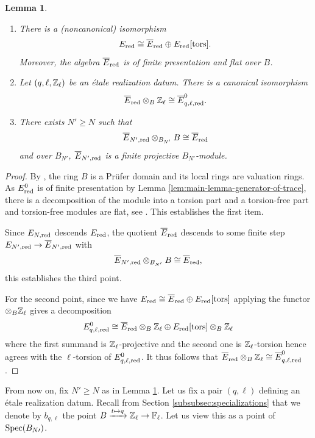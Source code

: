 \documentclass[a4paper, 10pt, oneside, reqno]{amsart}
\theoremstyle{plain}
\newtheorem{lem}[thm]{Lemma}
\theoremstyle{definition}
\theoremstyle{remark}
\begin{document}
\begin{lem}\label{lem:structural-properties-reduced-ring}
\begin{enumerate}
\item There is a (noncanonical) isomorphism 
$$E_{\mathrm{red}} \cong \overline{E}_{\mathrm{red}} \oplus E_{\mathrm{red}}[\mathrm{tors}].$$
Moreover, the algebra $\overline{E}_{\mathrm{red}}$ is of finite presentation and flat over $B$.
\item Let $(q,\ell, \mathbb{Z}_{\ell})$ be an étale realization datum. There is a canonical isomorphism 
$$\overline{E}_{\mathrm{red}} \otimes_B \mathbb{Z}_{\ell} \cong \overline{E}^{0}_{q,\ell,\mathrm{red}}.$$
\item There exists $N' \geq N$ such that 
$$\overline{E}_{N', \mathrm{red}} \otimes_{B_{N'}} B \cong \overline{E}_{\mathrm{red}}$$
and over $B_{N'}$, $\overline{E}_{N', \mathrm{red}}$ is a finite projective $B_{N'}$-module.
\end{enumerate}
\end{lem}

\begin{proof}
By \cite[Theorem VI.1.7]{CahenChabert}, the ring $B$ is a Prüfer domain and its local rings are valuation rings. As $E_{\mathrm{red}}^0$ is of finite presentation by Lemma \ref{lem:main-lemma-generator-of-trace}, there is a decomposition of the module into a torsion part and a torsion-free part and torsion-free modules are flat, see \cite[Tag 0539]{StacksProject}. This establishes the first item. 

Since $E_{N,\mathrm{red}}$ descends $E_{\mathrm{red}}$, the quotient $\overline{E}_{\mathrm{red}}$ descends to some finite step $E_{N', \mathrm{red}} \rightarrow \overline{E}_{N',\mathrm{red}}$ with 
$$\overline{E}_{N', \mathrm{red}} \otimes_{B_{N'}} B \cong \overline{E}_{\mathrm{red}},$$
this establishes the third point. 

For the second point, since we have $E_{\mathrm{red}} \cong \overline{E}_{\mathrm{red}} \oplus E_{\mathrm{red}}[\mathrm{tors}]$ applying the functor $\otimes_B \mathbb{Z}_{\ell}$ gives a decomposition 
$$E^0_{q,\ell, \mathrm{red}} \cong \overline{E}_{\mathrm{red}} \otimes_{B} \mathbb{Z}_{\ell} \oplus E_{\mathrm{red}}[\mathrm{\mathrm{tors}}] \otimes_{B} \mathbb{Z}_{\ell}$$ 
where the first summand is $\mathbb{Z}_{\ell}$-projective and the second one is $\mathbb{Z}_{\ell}$-torsion hence agrees with the $\ell$-torsion of $E^0_{q,\ell, \mathrm{red}}$. It thus follows that $\overline{E}_{\mathrm{red}} \otimes_B \mathbb{Z}_{\ell} \cong \overline{E}^{0}_{q,\ell,\mathrm{red}}$.
\end{proof}

From now on, fix $N' \geq N$ as in Lemma \ref{lem:structural-properties-reduced-ring}. Let us fix a pair $(q, \ell)$ defining an étale realization datum. Recall from Section \ref{subsubsec:specializations} that we denote by $b_{q,\ell}$ the point $B \xrightarrow{t \mapsto q} \mathbb{Z}_{\ell} \to \mathbb{F}_{\ell}$. Let us view this as a point of $\mathrm{Spec}(B_{N\prime})$. 
\end{document}
